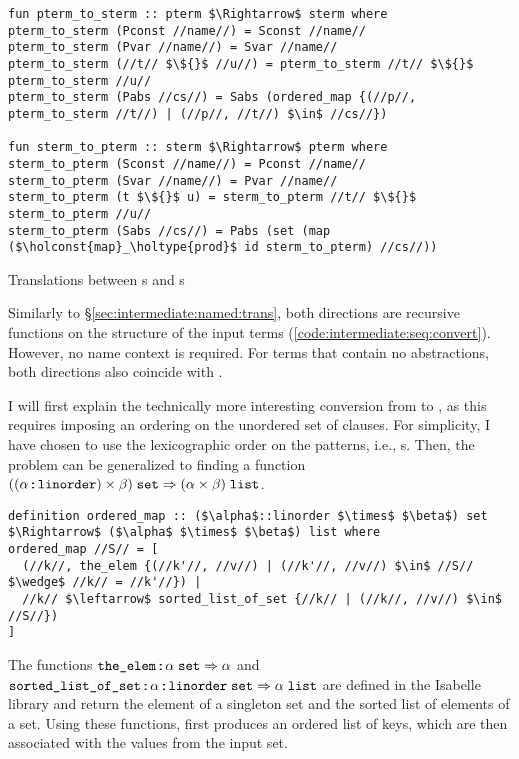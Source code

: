 \begin{code}[t]
  \begin{lstlisting}[language=Isabelle]
fun pterm_to_sterm :: pterm $\Rightarrow$ sterm where
pterm_to_sterm (Pconst //name//) = Sconst //name//
pterm_to_sterm (Pvar //name//) = Svar //name//
pterm_to_sterm (//t// $\${}$ //u//) = pterm_to_sterm //t// $\${}$ pterm_to_sterm //u//
pterm_to_sterm (Pabs //cs//) = Sabs (ordered_map {(//p//, pterm_to_sterm //t//) | (//p//, //t//) $\in$ //cs//})

fun sterm_to_pterm :: sterm $\Rightarrow$ pterm where
sterm_to_pterm (Sconst //name//) = Pconst //name//
sterm_to_pterm (Svar //name//) = Pvar //name//
sterm_to_pterm (t $\${}$ u) = sterm_to_pterm //t// $\${}$ sterm_to_pterm //u//
sterm_to_pterm (Sabs //cs//) = Pabs (set (map ($\holconst{map}_\holtype{prod}$ id sterm_to_pterm) //cs//))\end{lstlisting}
  \caption{Translations between s and s}
  \label{code:intermediate:seq:convert}
\end{code}

Similarly to §\ref{sec:intermediate:named:trans}, both directions are recursive functions on the structure of the input terms (\cref{code:intermediate:seq:convert}).
However, no name context is required.
For terms that contain no abstractions, both directions also coincide with .

I will first explain the technically more interesting conversion from  to , as this requires imposing an ordering on the unordered set of clauses.
For simplicity, I have chosen to use the lexicographic order on the patterns, i.e., s.
Then, the problem can be generalized to finding a function $((\alpha \mathbin{:\!\!:} \texttt{\textup{linorder}}) \times \beta)\;\texttt{\textup{set}} \Rightarrow (\alpha \times \beta)\;\texttt{\textup{list}}$.
%
\begin{lstlisting}[language=Isabelle]
definition ordered_map :: ($\alpha$::linorder $\times$ $\beta$) set $\Rightarrow$ ($\alpha$ $\times$ $\beta$) list where
ordered_map //S// = [
  (//k//, the_elem {(//k'//, //v//) | (//k'//, //v//) $\in$ //S// $\wedge$ //k// = //k'//}) |
  //k// $\leftarrow$ sorted_list_of_set {//k// | (//k//, //v//) $\in$ //S//})
]
\end{lstlisting}
%
\noindent
The functions $\texttt{\textup{the\_elem}} \mathbin{:\!\!:} \alpha\;\texttt{\textup{set}} \Rightarrow \alpha$ and $\texttt{\textup{sorted\_list\_of\_set}} \mathbin{:\!\!:} \alpha \mathbin{:\!\!:} \texttt{\textup{linorder}}\;\texttt{\textup{set}} \Rightarrow \alpha\;\texttt{\textup{list}}$ are defined in the Isabelle library and return the element of a singleton set and the sorted list of elements of a set.
Using these functions,  first produces an ordered list of keys, which are then associated with the values from the input set.


